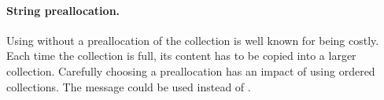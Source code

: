 \documentclass[a4paper,10pt,twoside]{book}
\begin{document}
%
%
%
%
%
%
%
%
%


\paragraph{String preallocation.} Using  without a preallocation of the collection is well known for being costly. Each time the collection is full, its content has to be copied into a larger collection. Carefully choosing a preallocation has an impact of using ordered collections. The message  could be used instead of .

\end{document}
